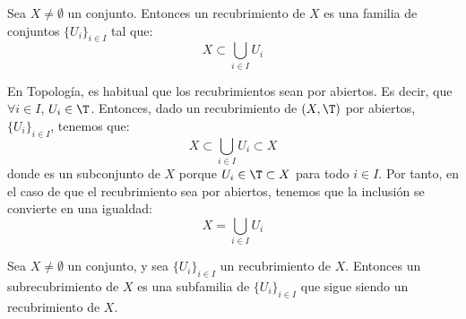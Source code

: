 \begin{definicion}[Recubrimiento]
    Sea $X\neq \emptyset$ un conjunto. Entonces un recubrimiento de $X$ es una familia de conjuntos $\{U_i\}_{i\in I}$ tal que:
    \begin{equation*}
        X\subset \bigcup_{i\in I} U_i
    \end{equation*}
\end{definicion}
\begin{observacion}
    En Topología, es habitual que los recubrimientos sean por abiertos. Es decir, que $\forall i\in I$, $U_i\in \T$.
    Entonces, dado un recubrimiento de $(X,\T)$ por abiertos, $\{U_i\}_{i\in I}$, tenemos que:
    \begin{equation*}
        X\subset \bigcup_{i\in I} U_i \subset X
    \end{equation*}
    donde es un subconjunto de $X$ porque $U_i\in \T\subset X$ para todo $i\in I$. Por tanto, en el caso de que el recubrimiento sea por abiertos, tenemos que la inclusión se convierte en una igualdad:
    \begin{equation*}
        X= \bigcup_{i\in I} U_i
    \end{equation*}
\end{observacion}

\begin{definicion}[Subrecubrimiento]
    Sea $X\neq \emptyset$ un conjunto, y sea $\{U_i\}_{i\in I}$ un recubrimiento de $X$. Entonces un subrecubrimiento de $X$ es una subfamilia de $\{U_i\}_{i\in I}$ que sigue siendo un recubrimiento de $X$.
\end{definicion}


